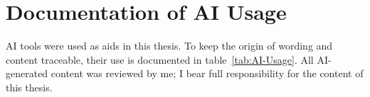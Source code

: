 %
%
%
%
%

\chapter{Documentation of AI Usage}
\label{cha:AI-Documentation}

AI tools were used as aids in this thesis. To keep the origin of wording and content traceable, their use is documented in table~\ref{tab:AI-Usage}. All AI-generated content was reviewed by me; I bear full responsibility for the content of this thesis.


